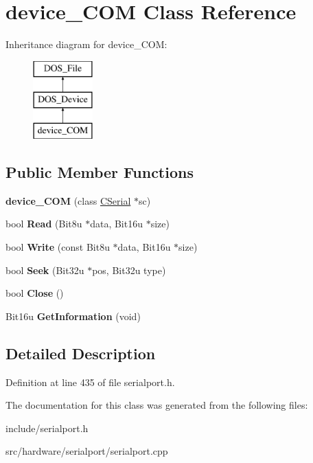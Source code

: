 \hypertarget{classdevice__COM}{\section{device\-\_\-\-C\-O\-M Class Reference}
\label{classdevice__COM}
}
Inheritance diagram for device\-\_\-\-C\-O\-M\-:\begin{figure}[H]
\begin{center}
\leavevmode
\includegraphics[height=3.000000cm]{classdevice__COM}
\end{center}
\end{figure}
\subsection*{Public Member Functions}
\begin{DoxyCompactItemize}
\item 
\hypertarget{classdevice__COM_a27121b64d7af922b43f2a440845f5f30}{{\bfseries device\-\_\-\-C\-O\-M} (class \hyperlink{classCSerial}{C\-Serial} $\ast$sc)}\label{classdevice__COM_a27121b64d7af922b43f2a440845f5f30}

\item 
\hypertarget{classdevice__COM_a1c1ae4216213b38d8df250b8a620d11d}{bool {\bfseries Read} (Bit8u $\ast$data, Bit16u $\ast$size)}\label{classdevice__COM_a1c1ae4216213b38d8df250b8a620d11d}

\item 
\hypertarget{classdevice__COM_abc6d2c0711908166b5e41e3028c37dd4}{bool {\bfseries Write} (const Bit8u $\ast$data, Bit16u $\ast$size)}\label{classdevice__COM_abc6d2c0711908166b5e41e3028c37dd4}

\item 
\hypertarget{classdevice__COM_a6532f789b0eb77a8d821b7ebc8923edc}{bool {\bfseries Seek} (Bit32u $\ast$pos, Bit32u type)}\label{classdevice__COM_a6532f789b0eb77a8d821b7ebc8923edc}

\item 
\hypertarget{classdevice__COM_a5d00c77725eba731dc7d766d2746ccd3}{bool {\bfseries Close} ()}\label{classdevice__COM_a5d00c77725eba731dc7d766d2746ccd3}

\item 
\hypertarget{classdevice__COM_a0f83ae83d1102e5191189983a18e8766}{Bit16u {\bfseries Get\-Information} (void)}\label{classdevice__COM_a0f83ae83d1102e5191189983a18e8766}

\end{DoxyCompactItemize}


\subsection{Detailed Description}


Definition at line 435 of file serialport.\-h.



The documentation for this class was generated from the following files\-:\begin{DoxyCompactItemize}
\item 
include/serialport.\-h\item 
src/hardware/serialport/serialport.\-cpp\end{DoxyCompactItemize}
